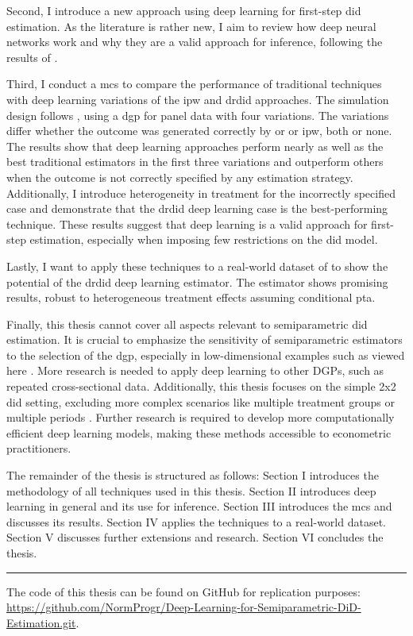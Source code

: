 Second, I introduce a new approach using deep learning for first-step \ac{did} estimation.
As the literature is rather new, I aim to review how deep neural networks work and why they are a valid approach for inference, following the results of \citet{farrellDeepNeuralNetworks2021}.

Third, I conduct a \ac{mcs} to compare the performance of traditional techniques with deep learning variations of the \ac{ipw} and \ac{drdid} approaches.
The simulation design follows \citet{santannaDoublyRobustDifferenceindifferences2020}, using a \ac{dgp} for panel data with four variations.
The variations differ whether the outcome was generated correctly by \ac{or} or \ac{ipw}, both or none.
The results show that deep learning approaches perform nearly as well as the best traditional estimators in the first three variations and outperform others when the outcome is not correctly specified by any estimation strategy.
Additionally, I introduce heterogeneity in treatment for the incorrectly specified case and demonstrate that the \ac{drdid} deep learning case is the best-performing technique.
These results suggest that deep learning is a valid approach for first-step estimation, especially when imposing few restrictions on the \ac{did} model.

Lastly, I want to apply these techniques to a real-world dataset of \citet{meyer1990workers} to show the potential of the \ac{drdid} deep learning estimator. %
The estimator shows promising results, robust to heterogeneous treatment effects assuming conditional \ac{pta}.

Finally, this thesis cannot cover all aspects relevant to semiparametric \ac{did} estimation.
It is crucial to emphasize the sensitivity of semiparametric estimators to the selection of the \ac{dgp}, especially in low-dimensional examples such as viewed here \citep{zimmert2018efficient}.
More research is needed to apply deep learning to other DGPs, such as repeated cross-sectional data.
Additionally, this thesis focuses on the simple 2x2 \ac{did} setting, excluding more complex scenarios like multiple treatment groups or multiple periods \citep[see][]{callawayDifferenceinDifferencesMultipleTime2021,goodman-baconDifferenceindifferencesVariationTreatment2021}.
Further research is required to develop more computationally efficient deep learning models, making these methods accessible to econometric practitioners.

The remainder of the thesis is structured as follows: Section I introduces the methodology of all techniques used in this thesis.
Section II introduces deep learning in general and its use for inference.
Section III introduces the \ac{mcs} and discusses its results.
Section IV applies the techniques to a real-world dataset.
Section V discusses further extensions and research.
Section VI concludes the thesis.

\noindent\rule{3cm}{0.5pt} %

\small
The code of this thesis can be found on GitHub for replication purposes:
\url{https://github.com/NormProgr/Deep-Learning-for-Semiparametric-DiD-Estimation.git}.
\normalsize

